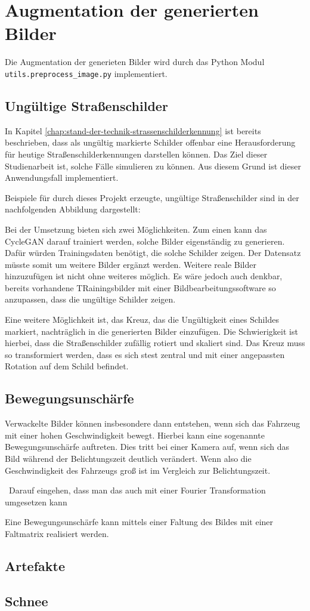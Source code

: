 \chapter{Augmentation der generierten Bilder}
Die Augmentation der generieten Bilder wird durch das Python Modul \lstinline[texcl=false]{utils.preprocess_image.py} implementiert.
\section{Ungültige Straßenschilder}
In Kapitel \ref{chap:stand-der-technik-strassenschilderkennung} ist bereits beschrieben, dass als ungültig markierte Schilder offenbar eine Herausforderung für heutige Straßenschilderkennungen darstellen können. Das Ziel dieser Studienarbeit ist, solche Fälle simulieren zu können. Aus diesem Grund ist dieser Anwendungsfall implementiert.

Beispiele für durch dieses Projekt erzeugte, ungültige Straßenschilder sind in der nachfolgenden Abbildung dargestellt:

Bei der Umsetzung bieten sich zwei Möglichkeiten. Zum einen kann das \ac{CycleGAN} darauf trainiert werden, solche Bilder eigenständig zu generieren. Dafür würden Trainingsdaten benötigt, die solche Schilder zeigen. Der Datensatz müsste somit um weitere Bilder ergänzt werden. Weitere reale Bilder hinzuzufügen ist nicht ohne weiteres möglich. Es wäre jedoch auch denkbar, bereits vorhandene TRainingsbilder mit einer Bildbearbeitungssoftware so anzupassen, dass die ungültige Schilder zeigen.

Eine weitere Möglichkeit ist, das Kreuz, das die Ungültigkeit eines Schildes markiert, nachträglich in die generierten Bilder einzufügen. Die Schwierigkeit ist hierbei, dass die Straßenschilder zufällig rotiert und skaliert sind. Das Kreuz muss so transformiert werden, dass es sich stest zentral und mit einer angepassten Rotation auf dem Schild befindet.

\section{Bewegungsunschärfe}
Verwackelte Bilder können insbesondere dann entstehen, wenn sich das Fahrzeug mit einer hohen Geschwindigkeit bewegt. Hierbei kann eine sogenannte Bewegungsunschärfe auftreten. Dies tritt bei einer Kamera auf, wenn sich das Bild während der Belichtungszeit deutlich verändert. Wenn also die Geschwindigkeit des Fahrzeugs groß ist im Vergleich zur Belichtungszeit.

~Darauf eingehen, dass man das auch mit einer Fourier Transformation umgesetzen kann~

Eine Bewegungsunschärfe kann mittels einer Faltung des Bildes mit einer Faltmatrix realisiert werden.
\section{Artefakte}
\section{Schnee}